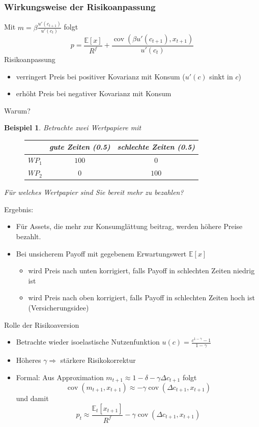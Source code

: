 \documentclass[12pt]{extreport} %
\theoremstyle{named}
\theoremstyle{nnamed}
\theoremstyle{itshape}
\theoremstyle{normal}
\newtheorem*{beispiel}{Beispiel}
\begin{document}
\subsubsection{Wirkungsweise der Risikoanpassung}

Mit $m = \beta \frac{u'(c_{t+1})}{u'(c_t)}$ folgt
	$$	p = \frac{\mathbb{E}[x]}{R^f} + \frac{\operatorname{cov}(\beta u'(c_{t+1}), x_{t+1})}{u'(c_t)} $$
Risikoanpassung
\begin{itemize}
	\item verringert Preis bei positiver Kovarianz mit Konsum ($u'(c)$ sinkt in $c$)
	\item erhöht Preis bei negativer Kovarianz mit Konsum
\end{itemize}
Warum?

\begin{beispiel}
	Betrachte zwei Wertpapiere mit 
	
	\begin{figure}[h!] \centering
		\begin{tabular}{l|cc}
  			~  & gute Zeiten (0.5) & schlechte Zeiten (0.5) \\
  			\hline
 			$WP_1$ & $100$ & $0$ \\
  			$WP_2$ & $0$ & $100$
		\end{tabular}
	\end{figure} 


	Für welches Wertpapier sind Sie bereit mehr zu bezahlen?	
\end{beispiel}


Ergebnis:
\begin{itemize}
	\item Für Assets, die mehr zur Konsumglättung beitrag, werden höhere Preise bezahlt.
	\item Bei unsicherem Payoff mit gegebenem Erwartungswert $\mathbb{E}[x]$
		\begin{itemize}
			\item wird Preis nach unten korrigiert, falls Payoff in schlechten Zeiten niedrig ist
			\item wird Preis nach oben korrigiert, falls Payoff in schlechten Zeiten hoch ist (Versicherungsidee)
		\end{itemize}
\end{itemize}

Rolle der Risikoaversion
\begin{itemize}
	\item Betrachte wieder isoelastische Nutzenfunktion $u(c) = \frac{c^{1-\gamma} - 1}{1 - \gamma}$
	\item Höheres $\gamma \Rightarrow$ stärkere Risikokorrektur
	\item Formal: Aus Approximation $m_{t+1} \approx 1 - \delta - \gamma \Delta c_{t+1}$ folgt 
		$$ \operatorname{cov}(m_{t+1}, x_{t+1}) \approx - \gamma \operatorname{cov}(\Delta c_{t+1}, x_{t+1}) $$
		und damit
		$$	p_t \approx \frac{\mathbb{E}_t[x_{t+1}]}{R^f} - \gamma \operatorname{cov}(\Delta c_{t+1}, x_{t+1}) $$
\end{itemize}
\end{document}
